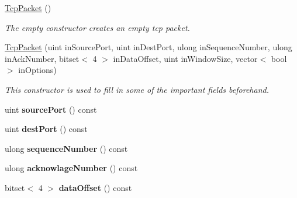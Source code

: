 \begin{DoxyCompactItemize}
\item 
\hypertarget{classwhisper__library_1_1TcpPacket_a82b91f3c55a8893c49102c0cfc40a433}{\hyperlink{classwhisper__library_1_1TcpPacket_a82b91f3c55a8893c49102c0cfc40a433}{\-Tcp\-Packet} ()}\label{classwhisper__library_1_1TcpPacket_a82b91f3c55a8893c49102c0cfc40a433}

\begin{DoxyCompactList}\small\item\em \-The empty constructor creates an empty tcp packet. \end{DoxyCompactList}\item 
\hyperlink{classwhisper__library_1_1TcpPacket_ae6e80d2107091af927ded7f07ebe7764}{\-Tcp\-Packet} (uint in\-Source\-Port, uint in\-Dest\-Port, ulong in\-Sequence\-Number, ulong in\-Ack\-Number, bitset$<$ 4 $>$ in\-Data\-Offset, uint in\-Window\-Size, vector$<$ bool $>$ in\-Options)
\begin{DoxyCompactList}\small\item\em \-This constructor is used to fill in some of the important fields beforehand. \end{DoxyCompactList}\item 
\hypertarget{classwhisper__library_1_1TcpPacket_a234bca8357dac29382195f9837363d0c}{uint {\bfseries source\-Port} () const }\label{classwhisper__library_1_1TcpPacket_a234bca8357dac29382195f9837363d0c}

\item 
\hypertarget{classwhisper__library_1_1TcpPacket_a7909f3bae44646ebd02930ee8e1d0fb1}{uint {\bfseries dest\-Port} () const }\label{classwhisper__library_1_1TcpPacket_a7909f3bae44646ebd02930ee8e1d0fb1}

\item 
\hypertarget{classwhisper__library_1_1TcpPacket_a959a01e2dedde0b62cae354a8ebad1a3}{ulong {\bfseries sequence\-Number} () const }\label{classwhisper__library_1_1TcpPacket_a959a01e2dedde0b62cae354a8ebad1a3}

\item 
\hypertarget{classwhisper__library_1_1TcpPacket_ac088334e95fa850fc11491c5e0b51ee5}{ulong {\bfseries acknowlage\-Number} () const }\label{classwhisper__library_1_1TcpPacket_ac088334e95fa850fc11491c5e0b51ee5}

\item 
\hypertarget{classwhisper__library_1_1TcpPacket_a42d4d2907a5b77c5da1613b64b335c30}{bitset$<$ 4 $>$ {\bfseries data\-Offset} () const }\label{classwhisper__library_1_1TcpPacket_a42d4d2907a5b77c5da1613b64b335c30}


\end{DoxyCompactItemize}
